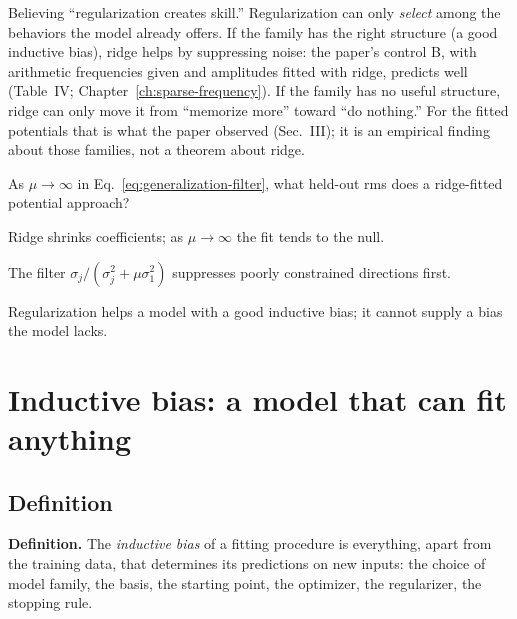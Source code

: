 \begin{pitfall}
Believing ``regularization creates skill.'' Regularization can only \emph{select} among the behaviors the model already offers. If the family has the right structure (a good inductive bias), ridge helps by suppressing noise: the paper's control B, with arithmetic frequencies given and amplitudes fitted with ridge, predicts well (Table~IV; Chapter~\ref{ch:sparse-frequency}). If the family has no useful structure, ridge can only move it from ``memorize more'' toward ``do nothing.'' For the fitted potentials that is what the paper observed (Sec.~III); it is an empirical finding about those families, not a theorem about ridge.
\end{pitfall}

\begin{checkpoint}
As $\mu\to\infty$ in Eq.~\eqref{eq:generalization-filter}, what held-out rms does a ridge-fitted potential approach?
\end{checkpoint}

\begin{keyideas}
\item Ridge shrinks coefficients; as $\mu\to\infty$ the fit tends to the null.
\item The filter $\sigma_j/(\sigma_j^2+\mu\sigma_1^2)$ suppresses poorly constrained directions first.
\item Regularization helps a model with a good inductive bias; it cannot supply a bias the model lacks.
\end{keyideas}

\section{Inductive bias: a model that can fit anything}\label{sec:generalization-bias}

\subsection{Definition}

\textbf{Definition.} The \emph{inductive bias} of a fitting procedure is everything, apart from the training data, that determines its predictions on new inputs: the choice of model family, the basis, the starting point, the optimizer, the regularizer, the stopping rule.

